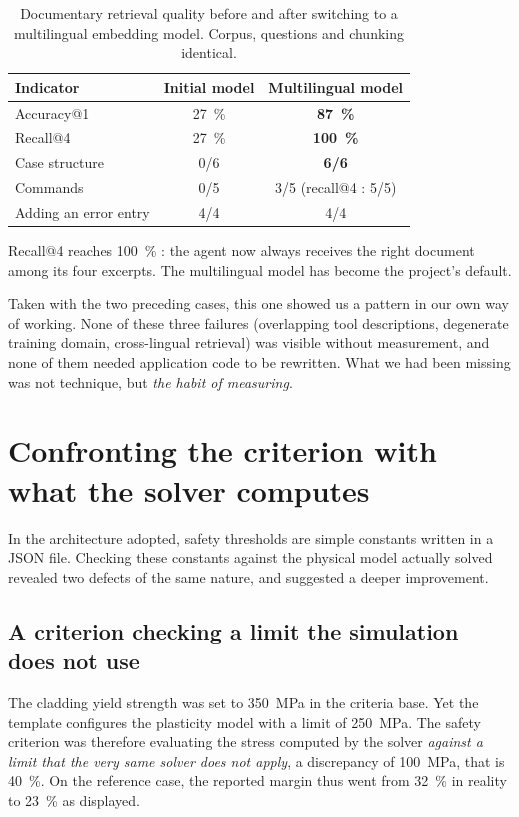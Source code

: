 \begin{table}[htbp]
\centering
\caption[Documentary retrieval quality]{Documentary retrieval quality before and
after switching to a multilingual embedding model. Corpus, questions and
chunking identical.}
\label{tab:rag}
\begin{tabularx}{0.92\textwidth}{@{}Xcc@{}}
\toprule
\textbf{Indicator} & \textbf{Initial model} & \textbf{Multilingual model}\\
\midrule
Accuracy@1 & \SI{27}{\percent} & \textbf{\SI{87}{\percent}}\\
Recall@4 & \SI{27}{\percent} & \textbf{\SI{100}{\percent}}\\
\midrule
Case structure & 0/6 & \textbf{6/6}\\
Commands & 0/5 & 3/5 (recall@4 : 5/5)\\
Adding an error entry & 4/4 & 4/4\\
\bottomrule
\end{tabularx}
\end{table}

Recall@4 reaches \SI{100}{\percent} : the agent now always receives the right
document among its four excerpts. The multilingual model has become the
project's default.

Taken with the two preceding cases, this one showed us a pattern in our own way
of working. None of these three failures (overlapping tool descriptions,
degenerate training domain, cross-lingual retrieval) was visible without
measurement, and none of them needed application code to be rewritten. What we
had been missing was not technique, but \emph{the habit of measuring}.

\section{Confronting the criterion with what the solver computes}
\label{sec:seuils}

In the architecture adopted, safety thresholds are simple constants written in a
JSON file. Checking these constants against the physical model actually solved
revealed two defects of the same nature, and suggested a deeper improvement.

\subsection{A criterion checking a limit the simulation does not use}

The cladding yield strength was set to \SI{350}{\mega\pascal} in the criteria
base. Yet the template configures the plasticity model with a limit of
\SI{250}{\mega\pascal}. The safety criterion was therefore evaluating the stress
computed by the solver \emph{against a limit that the very same solver does not apply}, a discrepancy of \SI{100}{\mega\pascal}, that is \SI{40}{\percent}. On
the reference case, the reported margin thus went from \SI{32}{\percent} in
reality to \SI{23}{\percent} as displayed.

